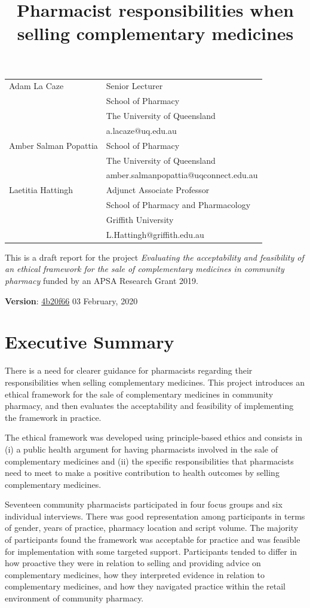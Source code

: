 \documentclass[11pt,a4paper]{article}
\title{Pharmacist responsibilities when selling complementary medicines}
\author{}
\date{}
\begin{document}
\maketitle

\begin{tabular}{ll} Adam La Caze & Senior Lecturer\tabularnewline
& School of Pharmacy\tabularnewline
& The University of Queensland\tabularnewline
& a.lacaze@uq.edu.au\tabularnewline[10pt] Amber Salman Popattia & School of Pharmacy\tabularnewline
& The University of Queensland\tabularnewline
& amber.salmanpopattia@uqconnect.edu.au\tabularnewline[10pt] Laetitia Hattingh & Adjunct Associate Professor\tabularnewline
& School of Pharmacy and Pharmacology\tabularnewline
& Griffith University\tabularnewline
& L.Hattingh@griffith.edu.au\tabularnewline
\end{tabular}

\vfill
This is a draft report for the project \emph{Evaluating the
acceptability and feasibility of an ethical framework for the sale of
complementary medicines in community pharmacy} funded by an APSA
Research Grant 2019.

\bigskip
\textbf{Version}:
\href{https://github.com/alacaze/cmethics_apsa}{4b20f66} \hfill 03
February, 2020

\newpage 

\tableofcontents

\newpage

\section*{Executive Summary}\label{executive-summary}

There is a need for clearer guidance for pharmacists regarding their
responsibilities when selling complementary medicines. This project
introduces an ethical framework for the sale of complementary medicines
in community pharmacy, and then evaluates the acceptability and
feasibility of implementing the framework in practice.

The ethical framework was developed using principle-based ethics and
consists in (i) a public health argument for having pharmacists involved
in the sale of complementary medicines and (ii) the specific
responsibilities that pharmacists need to meet to make a positive
contribution to health outcomes by selling complementary medicines.

Seventeen community pharmacists participated in four focus groups and
six individual interviews. There was good representation among
participants in terms of gender, years of practice, pharmacy location
and script volume. The majority of participants found the framework was
acceptable for practice and was feasible for implementation with some
targeted support. Participants tended to differ in how proactive they
were in relation to selling and providing advice on complementary
medicines, how they interpreted evidence in relation to complementary
medicines, and how they navigated practice within the retail environment
of community pharmacy.
\end{document}
